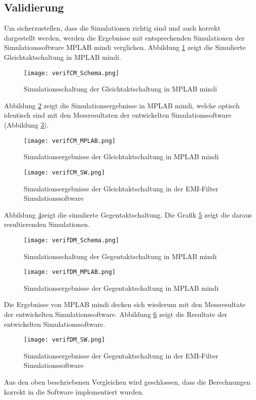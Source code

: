 \subsection{Validierung} \label{subsec:validierung}
Um sicherzustellen, dass die Simulationen richtig sind und auch korrekt dargestellt werden, werden die Ergebnisse mit entsprechenden Simulationen der Simulationssoftware MPLAB mindi verglichen. Abbildung \ref{fig:verifCM_Schema} zeigt die Simulierte Gleichtaktschaltung in MPLAB mindi.
\begin{figure}[H]
	\centering
	\texttt{[image: verifCM\_Schema.png]}
	\caption{Simulationsschaltung der Gleichtaktschaltung in MPLAB mindi}
	\label{fig:verifCM_Schema}
\end{figure}
 Abbildung \ref{fig:verifCM_MPLAB} zeigt die Simulationsergebnisse in MPLAB mindi, welche optisch identisch sind mit den Messresultaten der entwickelten Simulationssoftware (Abbildung \ref{fig:verifCM_SW}).
 \begin{figure}[H]
	\centering
	\texttt{[image: verifCM\_MPLAB.png]}
	\caption{Simulationsergebnisse der Gleichtaktschaltung in MPLAB mindi}
	\label{fig:verifCM_MPLAB}
\end{figure}
 \begin{figure}[H]
	\centering
	\texttt{[image: verifCM\_SW.png]}
	\caption{Simulationsergebnisse der Gleichtaktschaltung in der EMI-Filter Simulationssoftware}
	\label{fig:verifCM_SW}
\end{figure}


\newpage
Abbildung \ref{fig:verifDM_Schema}zeigt die simulierte Gegentaktschaltung. Die Grafik \ref{fig:verifDM_MPLAB} zeigt die daraus resultierenden Simulationen.
\begin{figure}[H]
	\centering
	\texttt{[image: verifDM\_Schema.png]}
	\caption{Simulationsschaltung der Gegentaktschaltung in MPLAB mindi}
	\label{fig:verifDM_Schema}
\end{figure}
\newpage
\begin{figure}[H]
	\centering
	\texttt{[image: verifDM\_MPLAB.png]}
 	\caption{Simulationsergebnisse der Gegentaktschaltung in MPLAB mindi}
	\label{fig:verifDM_MPLAB}
\end{figure}
Die Ergebnisse von MPLAB mindi decken sich wiederum mit den Messresultate der entwickelten Simulationssoftware. Abbildung \ref{fig:verifDM_SW} zeigt die Resultate der entwickelten Simulationssoftware.
\begin{figure}[H]
	\centering
	\texttt{[image: verifDM\_SW.png]}
	\caption{Simulationsergebnisse der Gegentaktschaltung in der EMI-Filter Simulationssoftware}
	\label{fig:verifDM_SW}
\end{figure}
Aus den oben beschriebenen Vergleichen wird geschlossen, dass die Berechnungen korrekt in die Software implementiert wurden.
\newpage

